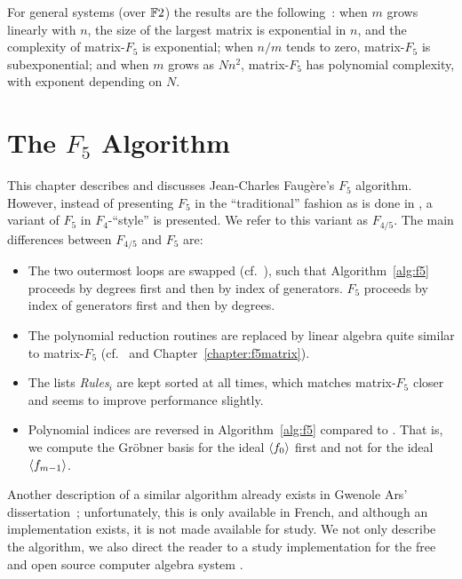 For general systems (over $\mathbb{F}{2}$) the results are the following~\cite{bardet-faugere-salvy:tech}: when $m$ grows linearly with $n$, the size of the largest matrix is exponential in $n$, and the complexity of matrix-$F_5$ is exponential; when $n/m$ tends to zero, matrix-$F_5$ is subexponential; and when $m$ grows as $Nn^2$, matrix-$F_5$ has polynomial complexity, with exponent depending on $N$.



\chapter{The \texorpdfstring{$F_5$}{F5} Algorithm}
\label{chapter:f5}


This chapter describes and discusses Jean-Charles Faugère's $F_5$ algorithm. However, instead of presenting $F_5$ in the ``traditional'' fashion as is done in \cite{f5,Stegers2005,Gash2008}, a variant of $F_5$ in $F_4$-``style'' is presented. We refer to this variant as $F_{4/5}$.
The main differences between $F_{4/5}$ and $F_5$ are:
\begin{itemize}
 \item The two outermost loops are swapped (cf.~\cite{faugere:fse2007}), such that Algorithm~\ref{alg:f5} proceeds by degrees first and then by index of generators. $F_5$ proceeds by index of generators first and then by degrees.
 \item The polynomial reduction routines are replaced by linear algebra quite similar to matrix-$F_5$ (cf.\ \cite{bardet-faugere-salvy:tech,faugere-ars-2004} and Chapter~\ref{chapter:f5matrix}).
 \item The lists \emph{Rules$_i$} are kept sorted at all times, which  matches matrix-$F_5$ closer and seems to improve performance slightly.
 \item Polynomial indices are reversed in Algorithm~\ref{alg:f5} compared to \cite{f5}. That is, we compute the Gröbner basis for the ideal $\langle {f_0} \rangle$ first and not for the ideal $\langle {f_{m-1}} \rangle$.
\end{itemize}

Another description of a similar algorithm already exists in Gwenole Ars' dissertation~\cite{ars:thesis2005}; unfortunately, this is only available in French, and although an implementation exists, it is not made available for study. We not only describe the algorithm, we also direct the reader to a study implementation for the free and open source \Sage computer algebra system \cite{sage}.

